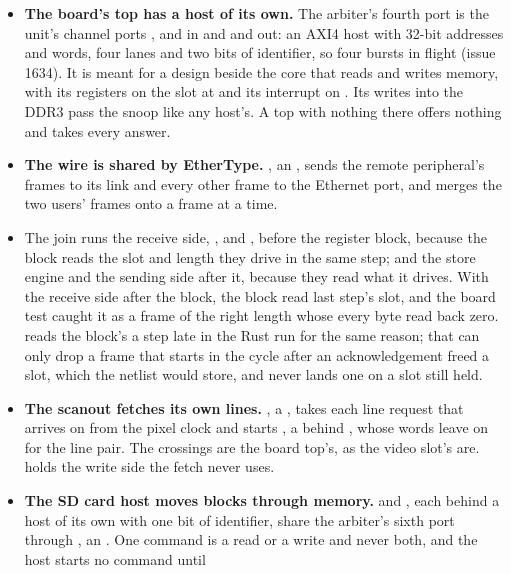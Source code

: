 \begin{itemize}
writes, and  takes turns for reads and for writes apart,
so sharing the port takes no turn from either (issue 1634).
\item \textbf{The board's top has a host of its own.} The arbiter's
fourth port is the unit's channel ports , 
and  in and  and  out: an AXI4
host with 32-bit addresses and words, four lanes and two bits of
identifier, so four bursts in flight (issue 1634). It is meant for a
design beside the core that reads and writes memory, with its
registers on the slot at  and its interrupt on
. Its writes into the DDR3 pass the snoop like any host's.
A top with nothing there offers nothing and takes every answer.
\item \textbf{The wire is shared by EtherType.} , an
, sends the remote peripheral's frames to its
link and every other frame to the Ethernet port, and merges the two
users' frames onto  a frame at a time.
\item The join runs the receive side, ,  and
, before the register block, because the block reads the
slot and length they drive in the same step; and the store engine and
the sending side after it, because they read what it drives. With the
receive side after the block, the block read last step's slot, and
the board test caught it as a frame of the right length whose every
byte read back zero.  reads the block's  a
step late in the Rust run for the same reason; that can only drop a
frame that starts in the cycle after an acknowledgement freed a slot,
which the netlist would store, and never lands one on a slot still
held.
\item \textbf{The scanout fetches its own lines.} , a
, takes each line request that arrives on
 from the pixel clock and starts , a
 behind , whose words leave on
 for the line pair. The crossings are the board
top's, as the video slot's are.  holds the write side
the fetch never uses.
\item \textbf{The SD card host moves blocks through memory.}
 and , each behind a host of its own with
one bit of identifier, share the arbiter's sixth port through
, an . One command is a
read or a write and never both, and the host starts no command until

\end{itemize}
